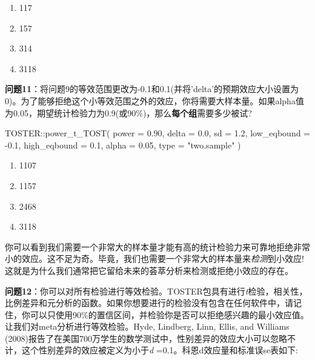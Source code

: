 \documentclass[
  letterpaper,
  DIV=11,
  numbers=noendperiod]{scrreprt}
\newenvironment{Shaded}{\begin{snugshade}}{\end{snugshade}}
\newcommand{\AttributeTok}[1]{\textcolor[rgb]{0.40,0.45,0.13}{#1}}
\newcommand{\FloatTok}[1]{\textcolor[rgb]{0.68,0.00,0.00}{#1}}
\newcommand{\FunctionTok}[1]{\textcolor[rgb]{0.28,0.35,0.67}{#1}}
\newcommand{\NormalTok}[1]{\textcolor[rgb]{0.00,0.23,0.31}{#1}}
\newcommand{\SpecialCharTok}[1]{\textcolor[rgb]{0.37,0.37,0.37}{#1}}
\newcommand{\StringTok}[1]{\textcolor[rgb]{0.13,0.47,0.30}{#1}}
\providecommand{\tightlist}{%
  \setlength{\itemsep}{0pt}\setlength{\parskip}{0pt}}\usepackage{longtable,booktabs,array}
\begin{document}
\begin{enumerate}
\def\labelenumi{\Alph{enumi})}
\tightlist
\item
  117
\item
  157
\item
  314
\item
  3118
\end{enumerate}

\textbf{问题11}：将问题9的等效范围更改为-0.1和0.1(并将'delta'的预期效应大小设置为0)。为了能够拒绝这个小等效范围之外的效应，你将需要大样本量。如果alpha值为0.05，期望统计检验力为0.9(或90\%)，那么\textbf{每个组}需要多少被试?

\begin{Shaded}
\begin{Highlighting}[]
\NormalTok{TOSTER}\SpecialCharTok{::}\FunctionTok{power\_t\_TOST}\NormalTok{(}
  \AttributeTok{power =} \FloatTok{0.90}\NormalTok{,}
  \AttributeTok{delta =} \FloatTok{0.0}\NormalTok{,}
  \AttributeTok{sd =} \FloatTok{1.2}\NormalTok{,}
  \AttributeTok{low\_eqbound =} \SpecialCharTok{{-}}\FloatTok{0.1}\NormalTok{,}
  \AttributeTok{high\_eqbound =} \FloatTok{0.1}\NormalTok{,}
  \AttributeTok{alpha =} \FloatTok{0.05}\NormalTok{,}
  \AttributeTok{type =} \StringTok{"two.sample"}
\NormalTok{)}
\end{Highlighting}
\end{Shaded}

\begin{enumerate}
\def\labelenumi{\Alph{enumi})}
\tightlist
\item
  1107
\item
  1157
\item
  2468
\item
  3118
\end{enumerate}

你可以看到我们需要一个非常大的样本量才能有高的统计检验力来可靠地拒绝非常小的效应。这不足为奇。毕竟，我们也需要一个非常大的样本量来\emph{检测}到小效应!这就是为什么我们通常把它留给未来的荟萃分析来检测或拒绝小效应的存在。

\textbf{问题12}：你可以对所有检验进行等效检验。TOSTER包具有进行\emph{t}检验，相关性，比例差异和元分析的函数。如果你想要进行的检验没有包含在任何软件中，请记住，你可以只使用90\%的置信区间，并检验你是否可以拒绝感兴趣的最小效应值。让我们对meta分析进行等效检验。Hyde,
Lindberg, Linn, Ellis, and Williams
(2008)报告了在美国700万学生的数学测试中，性别差异的效应大小可以忽略不计，这个性别差异的效应被定义为小于\emph{d}
=0.1。科恩d效应量和标准误se表如下:
\end{document}

